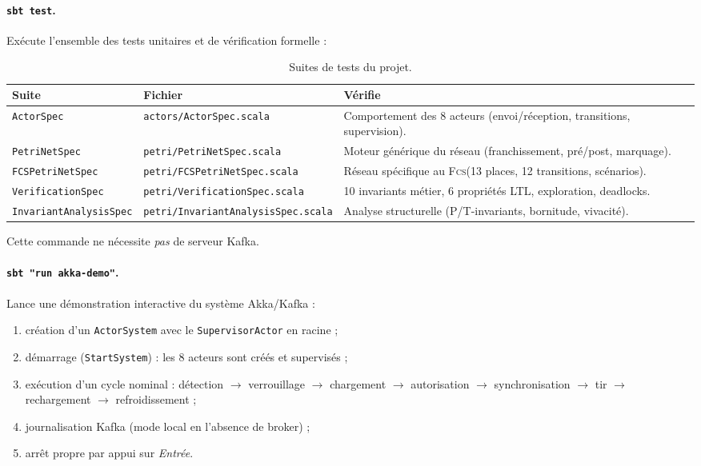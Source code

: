 \documentclass[11pt,a4paper]{article}
\newcommand{\fcs}{\textsc{Fcs}\xspace}
\newcommand{\code}[1]{\texttt{#1}}
\begin{document}
\paragraph{\code{sbt test}.}
Exécute l'ensemble des tests unitaires et de vérification formelle :

\begin{table}[H]
\centering\small
\begin{tabularx}{\linewidth}{l l X}
\toprule
\rowcolor{tableheader}\textbf{Suite} & \textbf{Fichier} & \textbf{Vérifie} \\
\midrule
\code{ActorSpec}            & \code{actors/ActorSpec.scala}
                            & Comportement des 8 acteurs (envoi/réception, transitions, supervision). \\
\code{PetriNetSpec}         & \code{petri/PetriNetSpec.scala}
                            & Moteur générique du réseau (franchissement, pré/post, marquage). \\
\code{FCSPetriNetSpec}      & \code{petri/FCSPetriNetSpec.scala}
                            & Réseau spécifique au \fcs (13 places, 12 transitions, scénarios). \\
\code{VerificationSpec}     & \code{petri/VerificationSpec.scala}
                            & 10 invariants métier, 6 propriétés LTL, exploration, deadlocks. \\
\code{InvariantAnalysisSpec}& \code{petri/InvariantAnalysisSpec.scala}
                            & Analyse structurelle (P/T-invariants, bornitude, vivacité). \\
\bottomrule
\end{tabularx}
\caption{Suites de tests du projet.}
\end{table}

Cette commande ne nécessite \emph{pas} de serveur Kafka.

\paragraph{\code{sbt "run akka-demo"}.}
Lance une démonstration interactive du système Akka/Kafka :
\begin{enumerate}[leftmargin=1.2cm,itemsep=1pt]
  \item création d'un \code{ActorSystem} avec le \code{SupervisorActor} en
        racine ;
  \item démarrage (\code{StartSystem}) : les 8 acteurs sont créés et
        supervisés ;
  \item exécution d'un cycle nominal : détection $\to$ verrouillage $\to$
        chargement $\to$ autorisation $\to$ synchronisation $\to$ tir $\to$
        rechargement $\to$ refroidissement ;
  \item journalisation Kafka (mode local en l'absence de broker) ;
  \item arrêt propre par appui sur \emph{Entrée}.
\end{enumerate}
\end{document}
